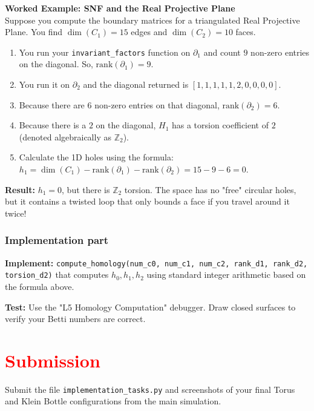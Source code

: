 \documentclass[11pt]{article}
\begin{document}
\vspace{0.5cm}
\noindent\textbf{Worked Example: SNF and the Real Projective Plane} \\
Suppose you compute the boundary matrices for a triangulated Real Projective Plane. You find $\dim(C_1) = 15$ edges and $\dim(C_2) = 10$ faces.
\begin{enumerate}
    \item You run your \lstinline|invariant_factors| function on $\partial_1$ and count $9$ non-zero entries on the diagonal. So, $\text{rank}(\partial_1) = 9$.
    \item You run it on $\partial_2$ and the diagonal returned is $[1, 1, 1, 1, 1, 2, 0, 0, 0, 0]$.
    \item Because there are $6$ non-zero entries on that diagonal, $\text{rank}(\partial_2) = 6$.
    \item Because there is a $2$ on the diagonal, $H_1$ has a torsion coefficient of $2$ (denoted algebraically as $\mathbb{Z}_2$).
    \item Calculate the 1D holes using the formula: \\
    $h_1 = \dim(C_1) - \text{rank}(\partial_1) - \text{rank}(\partial_2) = 15 - 9 - 6 = 0$.
\end{enumerate}
\textbf{Result:} $h_1 = 0$, but there is $\mathbb{Z}_2$ torsion. The space has no "free" circular holes, but it contains a twisted loop that only bounds a face if you travel around it twice!

\subsubsection*{Implementation part}
\textbf{Implement:} \lstinline|compute_homology(num_c0, num_c1, num_c2, rank_d1, rank_d2, torsion_d2)| that computes $h_0, h_1, h_2$ using standard integer arithmetic based on the formula above.

\textbf{Test:} Use the "L5 Homology Computation" debugger. Draw closed surfaces to verify your Betti numbers are correct.


\section*{\textcolor{red}{Submission}}

Submit the file \texttt{implementation\_tasks.py} and screenshots of your final Torus and Klein Bottle configurations from the main simulation.
\end{document}
